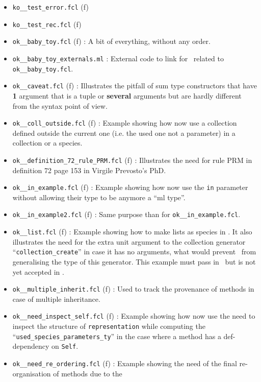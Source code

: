 \begin{itemize}
\begin{itemize}
  \item {\tt ko\_\_test\_error.fcl} (f)
  \item {\tt ko\_\_test\_rec.fcl} (f)
  \item {\tt ok\_\_baby\_toy.fcl} (f) : A bit of everything, without
    any order.
  \item {\tt ok\_\_baby\_toy\_externals.ml} : External code to link
    for \ocaml\ related to {\tt ok\_\_baby\_toy.fcl}.
  \item {\tt ok\_\_caveat.fcl} (f) : Illustrates the pitfall of sum
    type constructors that have {\bf 1} argument that is a tuple or
    {\bf several} arguments but are hardly different from the syntax
    point of view.
  \item {\tt ok\_\_coll\_outside.fcl} (f) : Example showing how now
    use a collection defined outside the current one (i.e. the used
    one not a parameter) in a collection or a species.
  \item {\tt ok\_\_definition\_72\_rule\_PRM.fcl} (f) : Illustrates
    the need for rule PRM in definition 72 page 153 in Virgile
    Prevosto's PhD.
    \item {\tt ok\_\_in\_example.fcl} (f) : Example showing how now
      use the {\tt in} parameter without allowing their type to be
      anymore a ``ml type''.
    \item {\tt ok\_\_in\_example2.fcl} (f) : Same purpose than for
      {\tt ok\_\_in\_example.fcl}.
    \item {\tt ok\_\_list.fcl} (f) : Example showing how to make lists
      as species in \focalize. It also illustrates the need for the
      extra unit argument to the collection generator
      ``{\tt collection\_create}'' in case it has no arguments, what
      would prevent \ocaml\ from generalising the type of this
      generator. This  example must pass in \ocaml\ but is not yet
      accepted in \coq.
    \item {\tt ok\_\_multiple\_inherit.fcl} (f) : Used to track the
      provenance of methods in case of multiple inheritance.
    \item {\tt ok\_\_need\_inspect\_self.fcl} (f) : Example showing
      how now use the need to inspect the structure of
      {\tt representation} while computing the \\
      ``{\tt used\_species\_parameters\_ty}'' in the case where a
      method has a  def-dependency on {\tt Self}.
    \item {\tt ok\_\_need\_re\_ordering.fcl} (f) : Example showing the
      need of the final re-organisation of methods due to the

\end{itemize}
\end{itemize}

